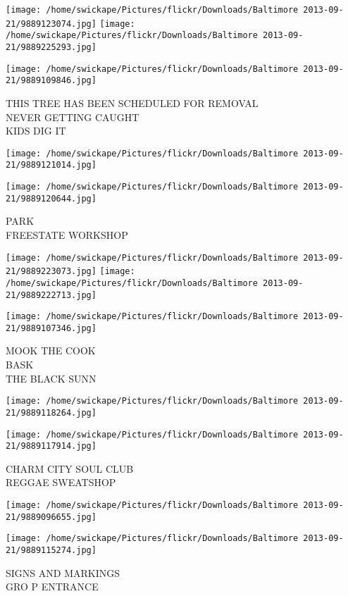 \documentclass[10pt,letterpaper]{article}
\begin{document}
\texttt{[image: /home/swickape/Pictures/flickr/Downloads/Baltimore 2013-09-21/9889123074.jpg]}
\texttt{[image: /home/swickape/Pictures/flickr/Downloads/Baltimore 2013-09-21/9889225293.jpg]}

\texttt{[image: /home/swickape/Pictures/flickr/Downloads/Baltimore 2013-09-21/9889109846.jpg]}

THIS TREE HAS BEEN SCHEDULED FOR REMOVAL\\
NEVER GETTING CAUGHT\\
KIDS DIG IT
\pagebreak

\texttt{[image: /home/swickape/Pictures/flickr/Downloads/Baltimore 2013-09-21/9889121014.jpg]}

\vspace{0.25in}
\texttt{[image: /home/swickape/Pictures/flickr/Downloads/Baltimore 2013-09-21/9889120644.jpg]}

PARK\\
FREESTATE WORKSHOP
\pagebreak

\texttt{[image: /home/swickape/Pictures/flickr/Downloads/Baltimore 2013-09-21/9889223073.jpg]}
\texttt{[image: /home/swickape/Pictures/flickr/Downloads/Baltimore 2013-09-21/9889222713.jpg]}

\texttt{[image: /home/swickape/Pictures/flickr/Downloads/Baltimore 2013-09-21/9889107346.jpg]}

MOOK THE COOK\\
BASK\\
THE BLACK SUNN
\pagebreak

\texttt{[image: /home/swickape/Pictures/flickr/Downloads/Baltimore 2013-09-21/9889118264.jpg]}

\vspace{0.25in}
\texttt{[image: /home/swickape/Pictures/flickr/Downloads/Baltimore 2013-09-21/9889117914.jpg]}

CHARM CITY SOUL CLUB\\
REGGAE SWEATSHOP
\pagebreak

\texttt{[image: /home/swickape/Pictures/flickr/Downloads/Baltimore 2013-09-21/9889096655.jpg]}

\vspace{0.25in}
\texttt{[image: /home/swickape/Pictures/flickr/Downloads/Baltimore 2013-09-21/9889115274.jpg]}

SIGNS AND MARKINGS\\
GRO P ENTRANCE
\pagebreak
\end{document}
